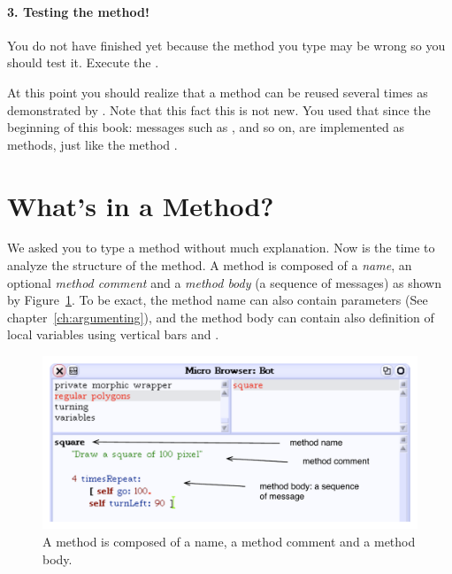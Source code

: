 
\paragraph{3. Testing the method!} You do not have finished yet because 
the method you type may be wrong so you should test it.  Execute the
.

At this point you should realize that a method can be reused several times as demonstrated by .  Note that this fact this is not new. 
You used that since the beginning of this book: messages such as \go, \turnLeft and so on, are implemented as methods, just like the method . 

\section{What's in a Method?}
We asked you to type a method without much explanation. Now is the time to
analyze the structure of the method. A method is composed of a \emph{name}, an optional \emph{method comment} and a \emph{method body} (a sequence of messages) as shown by Figure~\ref{fig:methodskeleton}. To be exact, the method name can also contain parameters (See
chapter~\ref{ch:argumenting}), and the method body can contain also
definition of local variables using vertical bars \ct{|} and \ct{|}.

\begin{figure}
\centerline{\includegraphics[width=15cm]{tbSixAnnotated}} 
\caption{A method is composed of a name, a method comment and a 
method body. \label{fig:methodskeleton}}
\end{figure}

